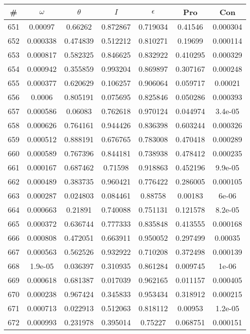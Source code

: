 \newpage
\begin{table}
\begin{tabular}{c|c|c|c|c|c|c}
\# & $\omega$ & $\theta$ & $I$ & $\epsilon$ & Pro & Con\\
\hline
651 & 0.00097 & 0.66262 & 0.872867 & 0.719034 & 0.41546 & 0.000304\\
652 & 0.000338 & 0.474839 & 0.512212 & 0.810271 & 0.19699 & 0.000114\\
653 & 0.000817 & 0.582325 & 0.846625 & 0.832922 & 0.410295 & 0.000329\\
654 & 0.000942 & 0.355859 & 0.993204 & 0.869897 & 0.307167 & 0.000248\\
655 & 0.000377 & 0.620629 & 0.106257 & 0.906064 & 0.059717 & 0.00021\\
656 & 0.0006 & 0.805191 & 0.075695 & 0.825846 & 0.050286 & 0.000393\\
657 & 0.000586 & 0.06083 & 0.762618 & 0.970124 & 0.044974 & 3.4e-05\\
658 & 0.000626 & 0.764161 & 0.944426 & 0.836398 & 0.603244 & 0.000326\\
659 & 0.000512 & 0.888191 & 0.676765 & 0.783008 & 0.470418 & 0.000289\\
660 & 0.000589 & 0.767396 & 0.844181 & 0.738938 & 0.478412 & 0.000235\\
661 & 0.000167 & 0.687462 & 0.71598 & 0.918863 & 0.452196 & 9.9e-05\\
662 & 0.000489 & 0.383735 & 0.960421 & 0.776422 & 0.286005 & 0.000105\\
663 & 0.000287 & 0.024803 & 0.084461 & 0.88758 & 0.00183 & 6e-06\\
664 & 0.000663 & 0.21891 & 0.740088 & 0.751131 & 0.121578 & 8.2e-05\\
665 & 0.000372 & 0.636744 & 0.777333 & 0.835848 & 0.413555 & 0.000168\\
666 & 0.000808 & 0.472051 & 0.663911 & 0.950052 & 0.297499 & 0.00035\\
667 & 0.000563 & 0.562526 & 0.932922 & 0.710208 & 0.372498 & 0.000139\\
668 & 1.9e-05 & 0.036397 & 0.310935 & 0.861284 & 0.009745 & 1e-06\\
669 & 0.000618 & 0.681387 & 0.017039 & 0.962165 & 0.011157 & 0.000405\\
670 & 0.000238 & 0.967424 & 0.345833 & 0.953434 & 0.318912 & 0.000215\\
671 & 0.000713 & 0.022913 & 0.512063 & 0.818112 & 0.00953 & 1.2e-05\\
672 & 0.000993 & 0.231978 & 0.395014 & 0.75227 & 0.068751 & 0.000151\\

\end{tabular}
\end{table}
